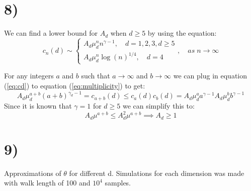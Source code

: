 \documentclass[a4paper]{article}
\begin{document}
\section*{8)}
We can find a lower bound for $A_d$ when $d \geq 5$ by using the equation:
\begin{equation}
    \label{eq:cd}
    c_n(d) \sim 
    \begin{cases}
        A_d\mu_d^nn^{\gamma-1}, \quad d = 1, 2, 3, d \geq 5 \\
        A_d\mu_d^n\log(n)^{1/4}, \quad d = 4
    \end{cases}, \quad as \; n \to \infty
\end{equation}

For any integers $a$ and $b$ such that $a \to \infty$ and $b \to \infty$ we can plug in equation (\ref{eq:cd}) to equation (\ref{eq:multiplicity}) to get:
\begin{equation}
    A_d\mu_d^{a+b}(a+b)^{\gamma_d-1} = c_{a+b}(d)\leq c_a(d)c_b(d) = A_d\mu_d^aa^{\gamma-1}A_d\mu_d^bb^{\gamma-1}
\end{equation}
Since it is known that $\gamma = 1$ for $d \geq 5$ we can simplify this to:
\begin{equation}
    A_d\mu^{a+b} \leq A_d^2\mu^{a+b} \implies A_d \geq 1
\end{equation}
\section*{9)}

\begin{table}[H]
    \centering
    \caption{Approximations of $\theta$ for different d. Simulations for each dimension was made with walk length of 100 and $10^4$ samples.}
    \label{tab:parameters_d}
    
\end{table}
\end{document}
